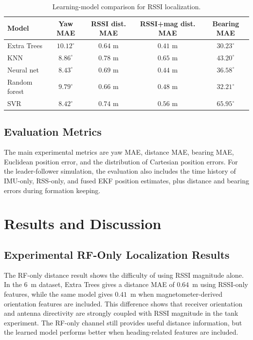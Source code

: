 \documentclass{uhcoethesis}
\begin{document}
\begin{table}[t]
    \centering
    \caption{Learning-model comparison for RSSI localization.}
    \label{tab:ch5_model_comparison}
    \scriptsize
    \setlength{\tabcolsep}{5pt}
    \begin{tabular}{lcccc}
        \hline
        Model & Yaw MAE & RSSI dist. MAE & RSSI+mag dist. MAE & Bearing MAE \\
        \hline
        Extra Trees & $10.12^\circ$ & $0.64$ m & $0.41$ m & $30.23^\circ$ \\
        KNN & $8.86^\circ$ & $0.78$ m & $0.65$ m & $43.20^\circ$ \\
        Neural net & $8.43^\circ$ & $0.69$ m & $0.44$ m & $36.58^\circ$ \\
        Random forest & $9.79^\circ$ & $0.66$ m & $0.48$ m & $32.21^\circ$ \\
        SVR & $8.42^\circ$ & $0.74$ m & $0.56$ m & $65.95^\circ$ \\
        \hline
    \end{tabular}
\end{table}

\subsection{Evaluation Metrics}

The main experimental metrics are yaw MAE, distance MAE, bearing MAE, Euclidean position error, and the distribution of Cartesian position errors. For the leader-follower simulation, the evaluation also includes the time history of IMU-only, RSS-only, and fused EKF position estimates, plus distance and bearing errors during formation keeping.

\section{Results and Discussion}
\label{sec:ch5_results_discussion}

\subsection{Experimental RF-Only Localization Results}

The RF-only distance result shows the difficulty of using RSSI magnitude alone. In the 6~m dataset, Extra Trees gives a distance MAE of $0.64$~m using RSSI-only features, while the same model gives $0.41$~m when magnetometer-derived orientation features are included. This difference shows that receiver orientation and antenna directivity are strongly coupled with RSSI magnitude in the tank experiment. The RF-only channel still provides useful distance information, but the learned model performs better when heading-related features are included.
\end{document}
